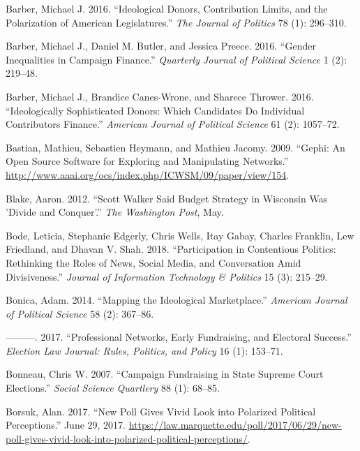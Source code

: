 \documentclass[12pt,]{article}
\begin{document}
\leavevmode\hypertarget{ref-barber2016a}{}%
Barber, Michael J. 2016. ``Ideological Donors, Contribution Limits, and
the Polarization of American Legislatures.'' \emph{The Journal of
Politics} 78 (1): 296--310.

\leavevmode\hypertarget{ref-barber2016b}{}%
Barber, Michael J., Daniel M. Butler, and Jessica Preece. 2016. ``Gender
Inequalities in Campaign Finance.'' \emph{Quarterly Journal of Political
Science} 1 (2): 219--48.

\leavevmode\hypertarget{ref-barber2016c}{}%
Barber, Michael J., Brandice Canes-Wrone, and Sharece Thrower. 2016.
``Ideologically Sophisticated Donors: Which Candidates Do Individual
Contributors Finance.'' \emph{American Journal of Political Science} 61
(2): 1057--72.

\leavevmode\hypertarget{ref-gephi}{}%
Bastian, Mathieu, Sebastien Heymann, and Mathieu Jacomy. 2009. ``Gephi:
An Open Source Software for Exploring and Manipulating Networks.''
\url{http://www.aaai.org/ocs/index.php/ICWSM/09/paper/view/154}.

\leavevmode\hypertarget{ref-blake2012}{}%
Blake, Aaron. 2012. ``Scott Walker Said Budget Strategy in Wisconsin Was
'Divide and Conquer'.'' \emph{The Washington Post}, May.

\leavevmode\hypertarget{ref-bode2018}{}%
Bode, Leticia, Stephanie Edgerly, Chris Wells, Itay Gabay, Charles
Franklin, Lew Friedland, and Dhavan V. Shah. 2018. ``Participation in
Contentious Politics: Rethinking the Roles of News, Social Media, and
Conversation Amid Divisiveness.'' \emph{Journal of Information
Technology \& Politics} 15 (3): 215--29.

\leavevmode\hypertarget{ref-bonica2014}{}%
Bonica, Adam. 2014. ``Mapping the Ideological Marketplace.''
\emph{American Journal of Political Science} 58 (2): 367--86.

\leavevmode\hypertarget{ref-bonica2017}{}%
---------. 2017. ``Professional Networks, Early Fundraising, and
Electoral Success.'' \emph{Election Law Journal: Rules, Politics, and
Policy} 16 (1): 153--71.

\leavevmode\hypertarget{ref-bonneau2007}{}%
Bonneau, Chris W. 2007. ``Campaign Fundraising in State Supreme Court
Elections.'' \emph{Social Science Quartlery} 88 (1): 68--85.

\leavevmode\hypertarget{ref-borsuk2017}{}%
Borsuk, Alan. 2017. ``New Poll Gives Vivid Look into Polarized Political
Perceptions.'' June 29, 2017.
\url{https://law.marquette.edu/poll/2017/06/29/new-poll-gives-vivid-look-into-polarized-political-perceptions/}.
\end{document}
